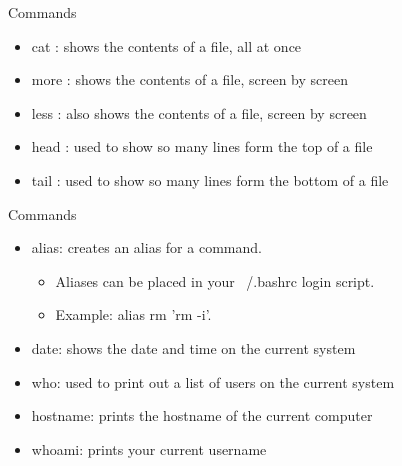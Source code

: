 \documentclass{beamer}
\begin{document}
\begin{frame}{Commands}
\begin{itemize}
\item cat : shows the contents of a file, all at once
\item more : shows the contents of a file, screen by screen
\item less : also shows the contents of a file, screen by screen
\item head : used to show so many lines form the top of a file
\item tail : used to show so many lines form the bottom of a file
\end{itemize}
\end{frame}

\begin{frame}{Commands}
\begin{itemize}
\item alias: creates an alias for a command.
\begin{itemize}
\item Aliases can be placed in your ~/.bashrc login script.
\item Example: alias rm 'rm -i'.
\end{itemize}
\item date: shows the date and time on the current system
\item who: used to print out a list of users on the current system
\item hostname: prints the hostname of the current computer
\item whoami: prints your current username
\end{itemize}
\end{frame}
\end{document}
